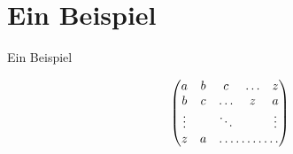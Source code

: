 \documentclass{beamer}
\begin{document}
\section{Ein Beispiel}
\begin{frame}[fragile]{Ein Beispiel}
\begin{LTXexample}
\usepackage{amsmath}
\[
\begin{pmatrix}
a & b & c & \hdots & z \\
b & c & \hdots & z & a\\
\vdots &&\ddots&& \vdots \\
z & a & \hdotsfor{3}
\end{pmatrix}
\]
\end{LTXexample}
\end{frame}
\end{document}
